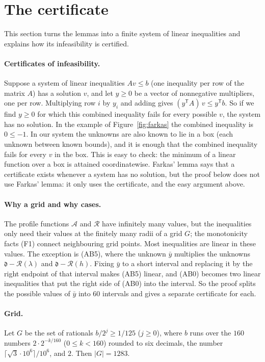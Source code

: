 \documentclass[11pt]{article}
\newcommand{\cA}{\mathcal{A}}
\newcommand{\cR}{\mathcal{R}}
\newcommand{\dd}{\mathfrak{d}}
\newcommand{\ybar}{\bar{y}}
\theoremstyle{remark}
\begin{document}
\section{The certificate}\label{sec:cert}

This section turns the lemmas into a finite system of linear inequalities
and explains how its infeasibility is certified.

\paragraph{Certificates of infeasibility.} Suppose a system of linear
inequalities $Av \le b$ (one inequality per row of the matrix $A$) has a
solution $v$, and let $y \ge 0$ be a vector of nonnegative multipliers, one
per row. Multiplying row $i$ by $y_i$ and adding gives
$(y^{\mathsf T}A)\,v \le y^{\mathsf T} b$. So if we find $y \ge 0$ for
which this combined inequality fails for every possible $v$, the system has
no solution. In the example of Figure~\ref{fig:farkas} the combined
inequality is $0 \le -1$. In our system the unknowns are also known to lie
in a box (each unknown between known bounds), and it is enough that the
combined inequality fails for every $v$ in the box. This is easy to check:
the minimum of a linear function over a box is attained coordinatewise.
Farkas' lemma says that a certificate exists whenever a system has no
solution, but the proof below does not use Farkas' lemma: it only uses the
certificate, and the easy argument above.

\paragraph{Why a grid and why cases.} The profile functions $\cA$ and
$\cR$ have infinitely many values, but the inequalities only need their
values at the finitely many radii of a grid $G$; the monotonicity facts
(F1) connect neighbouring grid points. Most inequalities are linear in
these values. The exception is (AB5), where the unknown $\ybar$ multiplies
the unknowns $\dd - \cR(\lambda)$ and $\dd - \cR(h)$. Fixing $\ybar$ to a
short interval and replacing it by the right endpoint of that interval
makes (AB5) linear, and (AB0) becomes two linear inequalities that put the
right side of (AB0) into the interval. So the proof splits the possible
values of $\ybar$ into $60$ intervals and gives a separate certificate for
each.

\paragraph{Grid.} Let $G$ be the set of rationals $b/2^j \ge 1/125$
($j \ge 0$), where $b$ runs over the $160$ numbers
$2\cdot 2^{-k/160}$ ($0 \le k < 160$) rounded to six decimals, the number
$\lceil\sqrt3\cdot 10^6\rceil/10^6$, and $2$. Then $|G| = 1283$.
\end{document}

